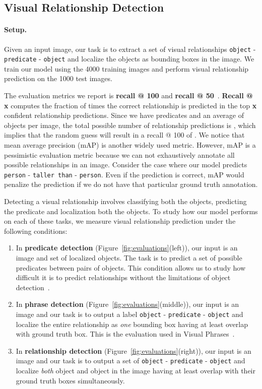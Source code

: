 \documentclass[runningheads]{llncs}
\newcommand{\relationship}[3]{\texttt{#1} - \texttt{#2} - \texttt{#3}}
\begin{document}
\subsection{Visual Relationship Detection}
\label{sec:vre}
\paragraph{Setup.} Given an input image, our task is to extract a set of visual relationships  \relationship{object}{predicate}{object} and localize the objects as bounding boxes in the image. We train our model using the 4000 training images and perform visual relationship prediction on the 1000 test images.

The evaluation metrics we report is \textbf{recall @ 100} and \textbf{recall @ 50}~\cite{alexe2012measuring}. {\bf Recall @ x} computes the fraction of times the correct relationship is predicted in the top {\bf x} confident relationship predictions. Since we have  predicates and an average of  objects per image, the total possible number of relationship predictions is , which implies that the random guess will result in a recall @ 100 of . We notice that mean average precision (mAP) is another widely used metric. However, mAP is a pessimistic evaluation metric because we can not exhaustively annotate all possible relationships in an image. Consider the case where our model predicts \relationship{person}{taller than}{person}. Even if the prediction is correct, mAP would penalize the prediction if we do not have that particular ground truth annotation.  

Detecting a visual relationship involves classifying both the objects, predicting the predicate and localization both the objects. To study how our model performs on each of these tasks, we measure visual relationship prediction under the following conditions:

\begin{enumerate}
  \item In \textbf{predicate detection} (Figure~\ref{fig:evaluations}(left)), our input is an image and set of localized objects. The task is to predict a set of possible predicates between pairs of objects. This condition allows us to study how difficult it is to predict relationships without the limitations of object detection~\cite{girshick14CVPR}.
  \item In \textbf{phrase detection} (Figure~\ref{fig:evaluations}(middle)), our input is an image and our task is to output a label \relationship{object}{predicate}{object} and localize the entire relationship as \textit{one} bounding box having at least  overlap with ground truth box. This is the evaluation used in Visual Phrases~\cite{sadeghi2011recognition}.
  \item In \textbf{relationship detection} (Figure~\ref{fig:evaluations}(right)), our input is an image and our task is to output a set of \relationship{object}{predicate}{object} and localize \textit{both} object and object in the image having at least  overlap with their ground truth boxes simultaneously.
\end{enumerate}
\end{document}
